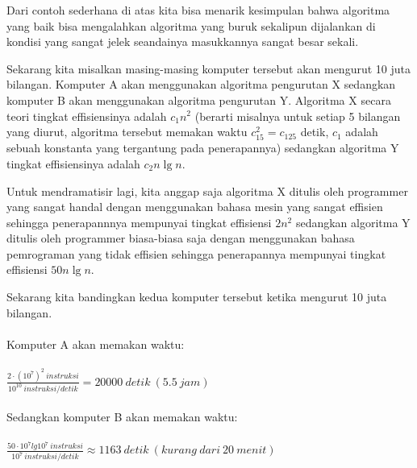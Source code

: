 Dari contoh sederhana di atas kita bisa menarik kesimpulan bahwa algoritma yang baik bisa mengalahkan algoritma yang buruk sekalipun dijalankan di kondisi yang sangat jelek seandainya masukkannya sangat besar sekali. 

Sekarang kita misalkan masing-masing komputer tersebut akan mengurut 10 juta bilangan. Komputer A akan menggunakan algoritma pengurutan X sedangkan komputer B akan menggunakan algoritma pengurutan Y. Algoritma X secara teori tingkat effisiensinya adalah $c_1n^2$ (berarti misalnya untuk setiap 5 bilangan yang diurut, algoritma tersebut memakan waktu $c_15^2 = c_125$ detik, $c_1$ adalah sebuah konstanta yang tergantung pada penerapannya) sedangkan algoritma Y tingkat effisiensinya adalah $c_2n\lg n$. 

Untuk mendramatisir lagi, kita anggap saja algoritma X ditulis oleh programmer yang sangat handal dengan menggunakan bahasa mesin yang sangat effisien sehingga penerapannnya mempunyai tingkat effisiensi $2n^2$ sedangkan algoritma Y ditulis oleh programmer biasa-biasa saja dengan menggunakan bahasa pemrograman yang tidak effisien sehingga penerapannya mempunyai tingkat effisiensi $50n\lg n$.

Sekarang kita bandingkan kedua komputer tersebut ketika mengurut 10 juta bilangan. 
\hspace*{\fill}\\\hspace*{\fill}\\
Komputer A akan memakan waktu:
\hspace*{\fill}\\\hspace*{\fill}\\
$\frac{2\cdot(10^7)^2\ instruksi}{10^{10}\ instruksi/detik} = 20000\ detik\ (5.5\ jam)$
\hspace*{\fill}\\\hspace*{\fill}\\
Sedangkan komputer B akan memakan waktu:
\hspace*{\fill}\\\hspace*{\fill}\\
$\frac{50\cdot10^7lg10^7\ instruksi}{10^{7}\ instruksi/detik} \approx 1163\ detik\ (kurang\ dari\ 20\ menit)$
\hspace*{\fill}\\\hspace*{\fill}\\

